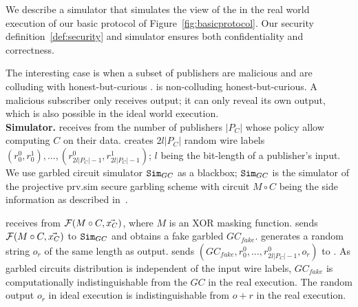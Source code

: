 %
%
%
%
%
%
%

We describe a simulator \Sim that simulates the view of the \Adv in the real
world execution of our basic protocol of Figure~\ref{fig:basicprotocol}. Our
security definition~\ref{def:security} and simulator \Sim ensures both
confidentiality and correctness.

The interesting case is when a subset of publishers are malicious and are
colluding with honest-but-curious \broker. \garbler is non-colluding
honest-but-curious. A malicious subscriber only receives output; it can only
reveal its own output, which is also possible in the ideal world execution.\\

\noindent\textbf{Simulator.} \Sim receives from \F the number of publishers
$|P_C|$ whose policy allow computing $C$ on their data. \Sim creates $2l|P_C|$
random wire labels $(r_0^0, r_0^1), \ldots, (r_{2l|P_C|-1}^0
,r_{2l|P_C|-1}^1)$; $l$ being the bit-length of a publisher's input. We use
garbled circuit simulator $\texttt{Sim}_{GC}$ as a blackbox; $\texttt{Sim}_{GC}$ is the
simulator of the projective prv.sim secure garbling scheme with circuit $M
\circ C$ being the side information as described in~\cite{}. 

\Sim receives from \F $\mathcal{F}(M \circ C, \vec{x_C})$, where $M$ is an XOR masking
function. \Sim sends $\mathcal{F}(M \circ C, \vec{x_C})$ to $\texttt{Sim}_{GC}$ and obtains a
fake garbled $GC_{fake}$. \Sim generates a random string $o_r$ of the same
length as output. \Sim sends $(GC_{fake}, r_0^0, \ldots, r_{2l|P_C|-1}^0, o_r)$
to \Adv. As garbled circuits distribution is independent of the input wire
labels, $GC_{fake}$ is computationally indistinguishable from the $GC$ in the
real execution. The random output $o_r$ in ideal execution is indistinguishable
from $o+r$ in the real execution.

